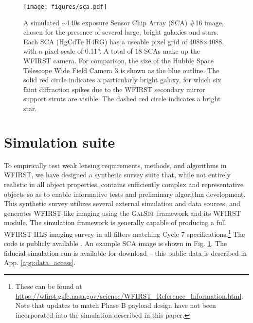 \documentclass[aps,prd, amsmath,amssymb,superscriptaddress,showkeys,nofootinbib,reprint,preprintnumbers]{revtex4-1}
\newcommand{\galsim}{\textsc{GalSim}}
\begin{document}
\begin{figure}
\begin{center}
\texttt{[image: figures/sca.pdf]}
\end{center}
\caption[]{
A simulated $\sim$140s exposure Sensor Chip Array (SCA) \#16 image, chosen for the presence of several large, bright galaxies and stars. Each SCA (HgCdTe H4RG) has a useable pixel grid of 4088$\times$4088, with a pixel scale of 0.11''. A total of 18 SCAs make up the WFIRST camera. For comparison, the size of the Hubble Space Telescope Wide Field Camera 3 is shown as the blue outline. The solid red circle indicates a particularly bright galaxy, for which six faint diffraction spikes due to the WFIRST secondary mirror support struts are visible. The dashed red circle indicates a bright star.
\label{fig:sca}}
\end{figure}





\section{Simulation suite}\label{sec:sim}

To empirically test weak lensing requirements, methods, and algorithms in WFIRST, we have designed a synthetic survey suite that, while not entirely realistic in all object properties, contains sufficiently complex and representative objects so as to enable informative tests and preliminary algorithm development. 
This synthetic survey utilizes several external simulation and data sources, and generates WFIRST-like imaging using the \galsim\ framework and its WFIRST module. 
The simulation framework is generally capable of producing a full WFIRST HLS imaging survey in all filters matching Cycle 7 specifications.\footnote{These can be found at \url{https://wfirst.gsfc.nasa.gov/science/WFIRST_Reference_Information.html}. Note that updates to match Phase B payload design have not been incorporated into the simulation described in this paper.} 
The code is publicly available \cite{wfirst_imsim}. An example SCA image is shown in Fig. \ref{fig:sca}. The fiducial simulation run is available for download -- this public data is described in App. \ref{app:data_access}.
\end{document}
